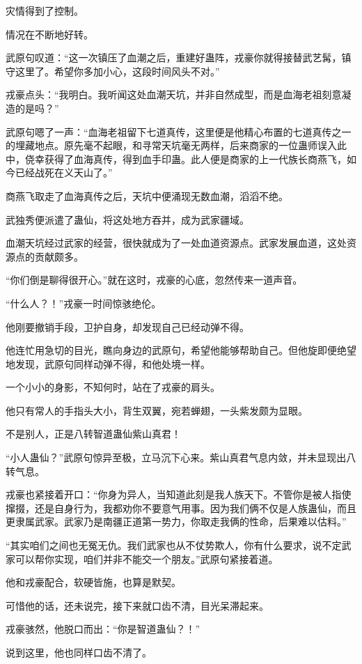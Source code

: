 \begin{this_body}
灾情得到了控制。

情况在不断地好转。

武原句叹道：“这一次镇压了血潮之后，重建好蛊阵，戎豪你就得接替武艺髯，镇守这里了。希望你多加小心，这段时间风头不对。”

戎豪点头：“我明白。我听闻这处血潮天坑，并非自然成型，而是血海老祖刻意凝造的是吗？”

武原句嗯了一声：“血海老祖留下七道真传，这里便是他精心布置的七道真传之一的埋藏地点。原先毫不起眼，和寻常天坑毫无两样，后来商家的一位蛊师误入此中，侥幸获得了血海真传，得到血手印蛊。此人便是商家的上一代族长商燕飞，如今已经战死在义天山了。”

商燕飞取走了血海真传之后，天坑中便涌现无数血潮，滔滔不绝。

武独秀便派遣了蛊仙，将这处地方吞并，成为武家疆域。

血潮天坑经过武家的经营，很快就成为了一处血道资源点。武家发展血道，这处资源点的贡献颇多。

“你们倒是聊得很开心。”就在这时，戎豪的心底，忽然传来一道声音。

“什么人？！”戎豪一时间惊骇绝伦。

他刚要撤销手段，卫护自身，却发现自己已经动弹不得。

他连忙用急切的目光，瞧向身边的武原句，希望他能够帮助自己。但他旋即便绝望地发现，武原句同样动弹不得，和他处境一样。

一个小小的身影，不知何时，站在了戎豪的肩头。

他只有常人的手指头大小，背生双翼，宛若蝉翅，一头紫发颇为显眼。

不是别人，正是八转智道蛊仙紫山真君！

“小人蛊仙？”武原句惊异至极，立马沉下心来。紫山真君气息内敛，并未显现出八转气息。

戎豪也紧接着开口：“你身为异人，当知道此刻是我人族天下。不管你是被人指使撺掇，还是自身行为，我都劝你不要意气用事。因为我们俩不仅是人族蛊仙，而且更隶属武家。武家乃是南疆正道第一势力，你取走我俩的性命，后果难以估料。”

“其实咱们之间也无冤无仇。我们武家也从不仗势欺人，你有什么要求，说不定武家可以帮你实现，咱们并非不能交一个朋友。”武原句紧接着道。

他和戎豪配合，软硬皆施，也算是默契。

可惜他的话，还未说完，接下来就口齿不清，目光呆滞起来。

戎豪骇然，他脱口而出：“你是智道蛊仙？！”

说到这里，他也同样口齿不清了。


\end{this_body}

